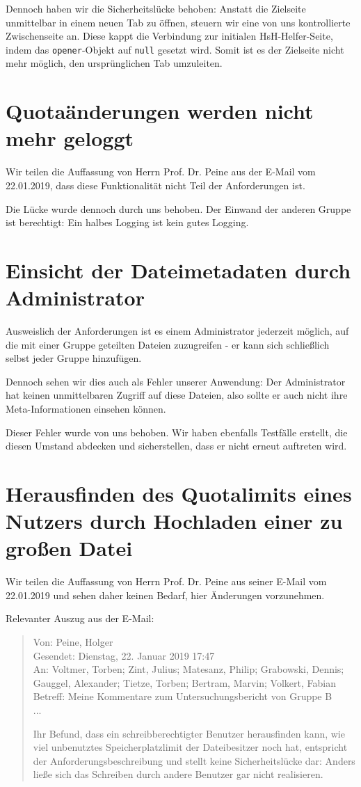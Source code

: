 \documentclass[12pt,DIV14,BCOR10mm,a4paper,parskip=half-,headsepline,headinclude,english,ngerman,bibliography=totocnumbered]{scrreprt}
\begin{document}
Dennoch haben wir die Sicherheitslücke behoben: Anstatt die Zielseite unmittelbar in einem neuen Tab zu öffnen, steuern wir eine von uns kontrollierte Zwischenseite an. Diese kappt die Verbindung zur initialen HsH-Helfer-Seite, indem das \texttt{opener}-Objekt auf \texttt{null} gesetzt wird.
Somit ist es der Zielseite nicht mehr möglich, den ursprünglichen Tab umzuleiten.

\section{Quotaänderungen werden nicht mehr geloggt}

Wir teilen die Auffassung von Herrn Prof. Dr. Peine aus der E-Mail vom 22.01.2019, dass diese Funktionalität nicht Teil der Anforderungen ist.

Die Lücke wurde dennoch durch uns behoben. Der Einwand der anderen Gruppe ist berechtigt: Ein halbes Logging ist kein gutes Logging.

\section{Einsicht der Dateimetadaten durch Administrator}

Ausweislich der Anforderungen ist es einem Administrator jederzeit möglich, auf die mit einer Gruppe geteilten Dateien zuzugreifen - er kann sich schließlich selbst jeder Gruppe hinzufügen.

Dennoch sehen wir dies auch als Fehler unserer Anwendung: Der Administrator hat keinen unmittelbaren Zugriff auf diese Dateien, also sollte er auch nicht ihre Meta-Informationen einsehen können.

Dieser Fehler wurde von uns behoben. Wir haben ebenfalls Testfälle erstellt, die diesen Umstand abdecken und sicherstellen, dass er nicht erneut auftreten wird.

\section{Herausfinden des Quotalimits eines Nutzers durch Hochladen einer zu großen Datei}

Wir teilen die Auffassung von Herrn Prof. Dr. Peine aus seiner E-Mail vom 22.01.2019 und sehen daher keinen Bedarf, hier Änderungen vorzunehmen.

Relevanter Auszug aus der E-Mail:

\blockquote{
Von: Peine, Holger \\
Gesendet: Dienstag, 22. Januar 2019 17:47 \\
An: Voltmer, Torben; Zint, Julius; Matesanz, Philip; Grabowski, Dennis; Gauggel, Alexander; Tietze, Torben; Bertram, Marvin; Volkert, Fabian  \\
Betreff: Meine Kommentare zum Untersuchungsbericht von Gruppe B \\

...

Ihr Befund, dass ein schreibberechtigter Benutzer herausfinden kann, wie viel
unbenutztes Speicherplatzlimit der Dateibesitzer noch hat, entspricht der
Anforderungsbeschreibung und stellt keine Sicherheitslücke dar: Anders ließe
sich das Schreiben durch andere Benutzer gar nicht realisieren.
}
\end{document}
